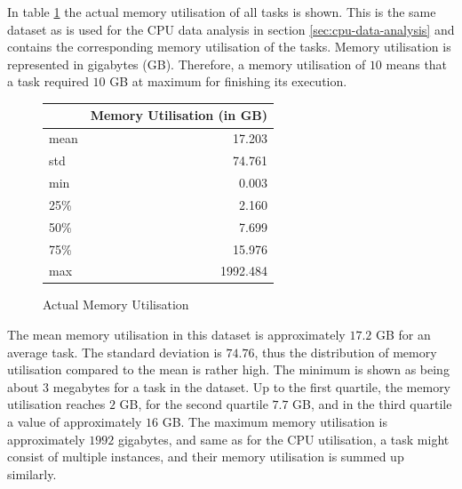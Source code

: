     In table \ref{tab:actual-memory-utilisation} the actual memory utilisation of all tasks is shown.
    This is the same dataset as is used for the CPU data analysis in section \ref{sec:cpu-data-analysis} and contains the corresponding memory utilisation of the tasks. Memory utilisation is represented in gigabytes (GB). 
    Therefore, a memory utilisation of $10$ means that a task required $10$ GB at maximum for finishing its execution.

    \begin{figure}
      \centering
      \caption{Actual Memory Utilisation}
      \label{tab:actual-memory-utilisation}
      \begin{tabular}{|l|r|}
        \toprule
        {} &  Memory Utilisation (in GB) \\
        \midrule
        mean  &    17.203 \\
        std   &    74.761 \\
        min   &     0.003 \\
        25\%   &     2.160 \\
        50\%   &     7.699 \\
        75\%   &    15.976 \\
        max   &  1992.484 \\
        \bottomrule
      \end{tabular}
    \end{figure}
    The mean memory utilisation in this dataset is approximately $17.2$ GB for an average task.
    The standard deviation is $74.76$, thus the distribution of memory utilisation compared to the mean is rather high.
    The minimum is shown as being about $3$ megabytes for a task in the dataset.
    Up to the first quartile, the memory utilisation reaches $2$ GB, for the second quartile $7.7$ GB, and in the third quartile a value of approximately $16$ GB.
    The maximum memory utilisation is approximately $1992$ gigabytes, and same as for the CPU utilisation, a task might consist of multiple instances, and their memory utilisation is summed up similarly.
    




